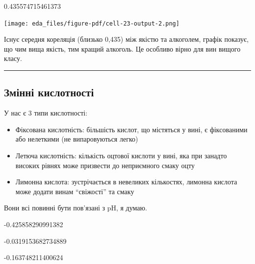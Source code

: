 \documentclass[
  letterpaper,
  DIV=11,
  numbers=noendperiod]{scrreprt}
\newenvironment{Shaded}{\begin{snugshade}}{\end{snugshade}}
\newcommand{\FunctionTok}[1]{\textcolor[rgb]{0.28,0.35,0.67}{#1}}
\newcommand{\NormalTok}[1]{\textcolor[rgb]{0.00,0.23,0.31}{#1}}
\newcommand{\SpecialCharTok}[1]{\textcolor[rgb]{0.37,0.37,0.37}{#1}}
\providecommand{\tightlist}{%
  \setlength{\itemsep}{0pt}\setlength{\parskip}{0pt}}\usepackage{longtable,booktabs,array}
\begin{document}
0.435574715461373

\texttt{[image: eda\_files/figure-pdf/cell-23-output-2.png]}

Існує середня кореляція (близько 0,435) між якістю та алкоголем, графік
показує, що чим вища якість, тим кращий алкоголь. Це особливо вірно для
вин вищого класу.

\begin{center}\rule{0.5\linewidth}{0.5pt}\end{center}

\subsection{Змінні
кислотності}\label{ux437ux43cux456ux43dux43dux456-ux43aux438ux441ux43bux43eux442ux43dux43eux441ux442ux456}

У нас є 3 типи кислотності:

\begin{itemize}
\tightlist
\item
  Фіксована кислотність: більшість кислот, що містяться у вині, є
  фіксованими або нелеткими (не випаровуються легко)
\item
  Летюча кислотність: кількість оцтової кислоти у вині, яка при занадто
  високих рівнях може призвести до неприємного смаку оцту
\item
  Лимонна кислота: зустрічається в невеликих кількостях, лимонна кислота
  може додати винам ``свіжості'' та смаку
\end{itemize}

Вони всі повинні бути пов'язані з pH, я думаю.

\begin{Shaded}
\end{Shaded}

-0.425858290991382

-0.0319153682734889

-0.163748211400624
\end{document}
